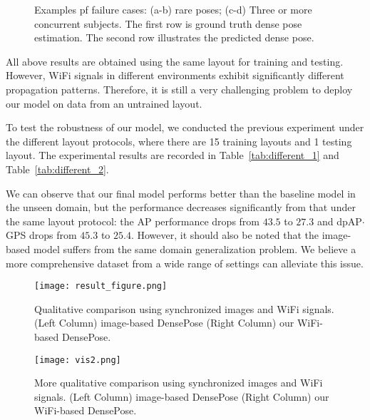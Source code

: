 \documentclass[sigconf, anonymous=false]{acmart}
\newcommand{\fer}[1]{\textcolor{blue}{[Fernando: #1]}}
\begin{document}
\begin{figure*}
\caption{Examples pf failure cases: (a-b) rare poses; (c-d) Three or more concurrent subjects. The first row is ground truth dense pose estimation. The second row illustrates the predicted dense pose.}
\label{fig:Fail}
\end{figure*}

All above results are obtained using the same layout for training and testing. However, WiFi signals in different environments exhibit significantly different propagation patterns. Therefore, it is still a very challenging problem to deploy our model on data from an untrained layout.  

To test the robustness of our model, we conducted the previous experiment under the different layout protocols, where there are 15 training layouts and 1 testing layout. The experimental results are recorded in Table~\ref{tab:different_1} and Table~\ref{tab:different_2}.

We can observe that our final model performs better than the baseline model in the unseen domain, but the performance decreases significantly from that under the same layout protocol: the AP performance drops from $43.5$ to $27.3$ and dpAP$\cdot$GPS drops from $45.3$ to $25.4$. However, it should also be noted that the image-based model suffers from the same domain generalization problem. We believe a more comprehensive dataset from a wide range of settings can alleviate this issue. 



\begin{figure*}[!htb]
\centering
\texttt{[image: result\_figure.png]}
\caption{Qualitative comparison using synchronized images and WiFi signals. (Left Column) image-based DensePose (Right Column) our WiFi-based DensePose.}
    \label{fig:Qualitative_1}
\end{figure*}

\begin{figure*}[!htb]
\centering
\texttt{[image: vis2.png]}
\caption{More qualitative comparison using synchronized images and WiFi signals. (Left Column) image-based DensePose (Right Column) our WiFi-based DensePose.}
    \label{fig:Qualitative_2}
\end{figure*}
\end{document}
